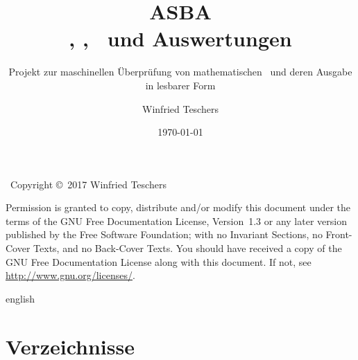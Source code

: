 \titlehead{
	{\Large Dr. Winfried Teschers}\\
	Anton-Günther-Straße 26c\\91083 Baiersdorf\\
	{\footnotesize winfried.teschers@t-online.de}
}
\subject{Projektdokument}
\title{{\Huge ASBA}\\\Axiome, \Saetze, \Beweise\ und Auswertungen}
\subtitle{Projekt zur maschinellen Überprüfung von mathematischen \Beweisen\ und deren Ausgabe in lesbarer Form}
\author{Winfried Teschers}
\date{\today}
\publishers{\vspace{1cm}\normalsize
	Es wird ein Programmsystem beschrieben, das zu eingegebenen Axiomen, Sätzen, und Beweisen letztere prüft, Auswertungen generiert und zu gegebenen Ausgabeschemata eine Ausgabe der Elemente in üblicher Formelschreibweise im \LaTeX-Format erstellt.
}



	\maketitle
	~\vfill Copyright \copyright\ 2017 Winfried Teschers\bigskip

	\begin{otherlanguage}{english}
		Permission is granted to copy, distribute and/or modify this document under the terms of the GNU Free Documentation License, Version~1.3 or any later version published by the Free Software Foundation; with no Invariant Sections, no Front-Cover Texts, and no Back-Cover Texts.
		You should have received a copy of the GNU Free Documentation License along with this document.
		If not, see \url{http://www.gnu.org/licenses/}.
	\end{otherlanguage}{english}

	\tableofcontents
	\Endchapter

	
	
	
	
	
	

	\chapter{Verzeichnisse}%
	\label{cha-Verzeichnisse}

	\newcommand*{\likesection}[2][section]{%
		\beginchapter[Verzeichnisse]{#2}
		\phantomsection%
		\addcontentsline{toc}{#1}{#2}%
	}

